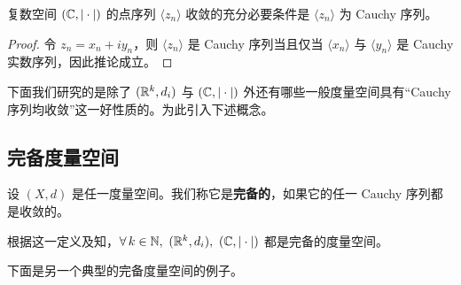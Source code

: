 \begin{mycor*}{}

复数空间 $(\mathbb{C},|\cdot|)$ 的点序列 $\langle z_n\rangle$ 收敛的充分必要条件是 $\langle z_n\rangle$ 为 Cauchy 序列。

\end{mycor*}

\begin{proof}

令 $z_n=x_n+iy_n$，则 $\langle z_n\rangle$ 是 Cauchy 序列当且仅当 $\langle x_n\rangle$ 与 $\langle y_n\rangle$ 是 Cauchy 实数序列，因此推论成立。

\end{proof}

下面我们研究的是除了 $(\mathbb{R}^k,d_i)$ 与 $(\mathbb{C},|\cdot|)$ 外还有哪些一般度量空间具有“Cauchy 序列均收敛”这一好性质的。为此引入下述概念。

\subsection{完备度量空间}
	\label{sec:10-4-2}

\begin{mydef*}{}

设 $(X,d)$ 是任一度量空间。我们称它是\textbf{完备的}，如果它的任一 Cauchy 序列都是收敛的。

\end{mydef*}

根据这一定义及知，$\forall\,k\in\N,\ (\R^k,d_i),\ (\C,|\cdot|)$ 都是完备的度量空间。

下面是另一个典型的完备度量空间的例子。

